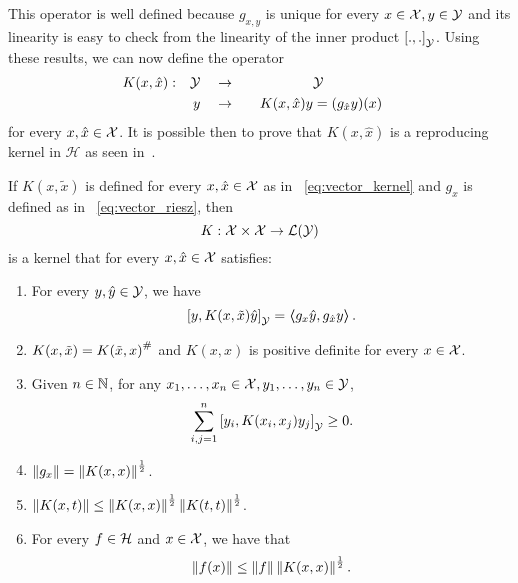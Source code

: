 This operator is well defined because $g_{x, y}$ is unique for every $x \in \mathcal{X}, y \in \mathcal{Y}$ and its linearity is easy to check from the linearity of the inner product $\left[ ., . \right]_\mathcal{Y}$.
%
Using these results, we can now define the operator
\begin{equation}\label{eq:vector_kernel}
    \begin{aligned}
        K(x, \hat{x}) : &  & \Yspace &  &  & \to &  &  &                 & \Yspace               &  & \\
                        &  & y       &  &  & \to &  &  & K(x, \hat{x}) y & = (g_{\hat{x}} y) (x) &  &
    \end{aligned}
\end{equation}
for every $x, \hat{x} \in \mathcal{X}$.
It is possible then to prove that $K(x, \hat{x})$ is a reproducing kernel in $\mathcal{H}$ as seen in~\citet[Propositon 2.1]{MicchelliP05}.

\begin{proposition}
    If $K(x, \tilde{x})$ is defined for every $x, \hat{x} \in \mathcal{X}$ as in ~\eqref{eq:vector_kernel} and $g_x$ is defined as in ~\eqref{eq:vector_riesz}, then
    \begin{equation}
        \nonumber
        K: \mathcal{X} \times \mathcal{X} \to \mathcal{L}(\mathcal{Y})
    \end{equation}
    is a kernel that for every $x, \hat{x} \in \mathcal{X}$ satisfies:
    \begin{enumerate}
        \item For every $y, \hat{y} \in \mathcal{Y}$, we have
              \begin{equation}
                  \nonumber
                  \left[ y, K(x, \tilde{x}) \hat{y} \right]_\mathcal{Y} = \bm{\left\langle} g_x \hat{y}, g_{\hat{x}} y \bm{\right\rangle} .
              \end{equation}
        \item $K(x, \tilde{x}) = {K(\tilde{x}, x)}^{\#}$ and $K(x, x)$ is positive definite for every $x \in \mathcal{X}$.
        \item Given $n \in \mathbb{N}$, for any  $x_1, \ldots, x_n \in \mathcal{X},  y_1, \ldots, y_n \in \mathcal{Y}$,
              \begin{equation}
                  \nonumber
                  \sum_{i, j =1}^n \left[ y_i, K(x_i, x_j) y_j \right]_\mathcal{Y} \geq 0.
              \end{equation}
        \item $\left\lVert g_x\right\rVert = \left\lVert K(x, x)\right\rVert^{\frac{1}{2}}$.
        \item $\left\lVert K(x, t)\right\rVert \leq \left\lVert K(x, x)\right\rVert^{\frac{1}{2}} \left\lVert K(t, t)\right\rVert^{\frac{1}{2}}$.
        \item For every $f \in \mathcal{H}$ and $x \in \mathcal{X}$, we have that
              $$ \left\lVert f(x)\right\rVert \leq \left\lVert f\right\rVert \left\lVert K(x, x)\right\rVert^{\frac{1}{2}} .$$
    \end{enumerate}
\end{proposition}

